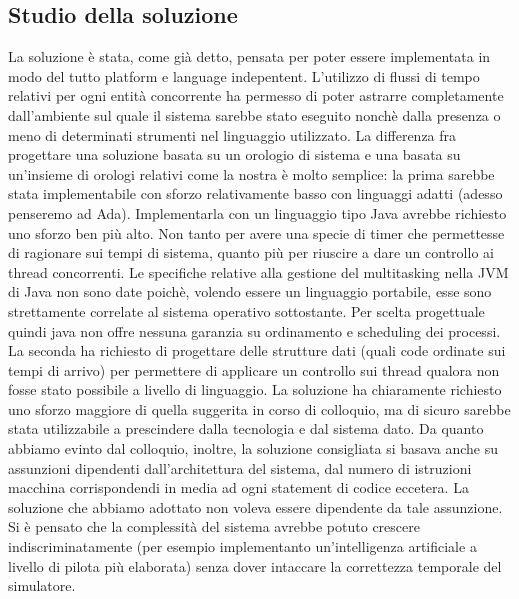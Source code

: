 \subsection{Studio della soluzione}
La soluzione è stata, come già detto, pensata per poter essere implementata in modo del tutto platform e language indepentent. L’utilizzo di flussi di tempo relativi per ogni entità concorrente ha permesso di poter astrarre completamente dall’ambiente sul quale il sistema sarebbe stato eseguito nonchè dalla presenza o meno di determinati strumenti nel linguaggio utilizzato.
La differenza fra progettare una soluzione basata su un orologio di sistema e una basata su un'insieme di orologi relativi come la nostra è molto semplice: la prima sarebbe stata implementabile con sforzo relativamente basso con linguaggi adatti (adesso penseremo ad Ada). Implementarla con un linguaggio tipo Java avrebbe richiesto uno sforzo ben più alto. Non tanto per avere una specie di timer che permettesse di ragionare sui tempi di sistema, quanto più per riuscire a dare un controllo ai thread concorrenti. Le specifiche relative alla gestione del multitasking nella JVM di Java non sono date poichè, volendo essere un linguaggio portabile, esse sono strettamente correlate al sistema operativo sottostante. Per scelta progettuale quindi java non offre nessuna garanzia su ordinamento e scheduling dei processi.
La seconda ha richiesto di progettare delle strutture dati (quali code ordinate sui tempi di arrivo) per permettere di applicare un controllo sui thread qualora non fosse stato possibile a livello di linguaggio. La soluzione ha chiaramente richiesto uno sforzo maggiore di quella suggerita in corso di colloquio, ma di sicuro sarebbe stata utilizzabile a prescindere dalla tecnologia e dal sistema dato.
Da quanto abbiamo evinto dal colloquio, inoltre, la soluzione consigliata si basava anche su assunzioni dipendenti dall’architettura del sistema, dal numero di istruzioni macchina corrispondendi in media ad ogni statement di codice eccetera. La soluzione che abbiamo adottato non voleva essere dipendente da tale assunzione. Si è pensato che la complessità del sistema avrebbe potuto crescere indiscriminatamente (per esempio implementanto un’intelligenza artificiale a livello di pilota più elaborata) senza dover intaccare la correttezza temporale del simulatore.
